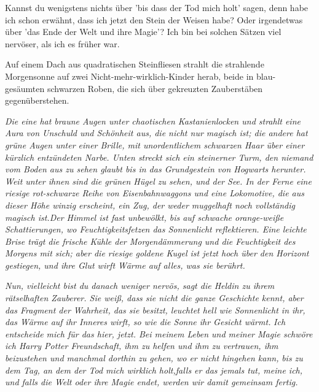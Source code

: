\glqq{}Kannst du wenigstens nichts über 'bis dass der Tod mich holt' sagen, denn
habe ich schon erwähnt, dass ich jetzt den Stein der Weisen habe? Oder
irgendetwas über 'das Ende der Welt und ihre Magie'? Ich bin bei solchen Sätzen
viel nervöser, als ich es früher war.\grqq{}

Auf einem Dach aus quadratischen Steinfliesen strahlt die strahlende Morgensonne
auf zwei Nicht-mehr-wirklich-Kinder herab, beide in blau-gesäumten schwarzen
Roben, die sich über gekreuzten Zauberstäben gegenüberstehen.

\emph{Die eine hat braune Augen unter chaotischen Kastanienlocken und strahlt
eine Aura von Unschuld und Schönheit aus, die nicht nur magisch ist; die andere
hat grüne Augen unter einer Brille, mit unordentlichem schwarzen Haar über einer
kürzlich entzündeten Narbe. Unten streckt sich ein steinerner Turm, den niemand
vom Boden aus zu sehen glaubt bis in das Grundgestein von Hogwarts herunter.
Weit unter ihnen sind die grünen Hügel zu sehen, und der See. In der Ferne eine
riesige rot-schwarze Reihe von Eisenbahnwaggons und eine Lokomotive, die aus
dieser Höhe winzig erscheint, ein Zug, der weder muggelhaft noch vollständig
magisch ist.Der Himmel ist fast unbewölkt, bis auf schwache orange-weiße
Schattierungen, wo Feuchtigkeitsfetzen das Sonnenlicht reflektieren. Eine
leichte Brise trägt die frische Kühle der Morgendämmerung und die Feuchtigkeit
des Morgens mit sich; aber die riesige goldene Kugel ist jetzt hoch über den
Horizont gestiegen, und ihre Glut wirft Wärme auf alles, was sie berührt.}

\emph{\glqq{}Nun, vielleicht bist du danach weniger nervös\grqq{}, sagt die
Heldin zu ihrem rätselhaften Zauberer. Sie weiß, dass sie nicht die ganze
Geschichte kennt, aber das Fragment der Wahrheit, das sie besitzt, leuchtet hell
wie Sonnenlicht in ihr, das Wärme auf ihr Inneres wirft, so wie die Sonne ihr
Gesicht wärmt.}    \emph{ \glqq{}Ich entscheide mich für das hier, jetzt. Bei
meinem Leben und meiner Magie schwöre ich Harry Potter Freundschaft,} \emph{ihm
zu helfen und ihm zu vertrauen, ihm beizustehen und manchmal dorthin zu gehen,
wo er nicht hingehen kann,}    \emph{bis zu dem Tag, an dem der Tod mich
wirklich holt,}\emph{falls er das jemals tut, meine ich, }   \emph{und falls die
Welt oder ihre Magie endet, werden wir damit gemeinsam fertig.\grqq{}}


